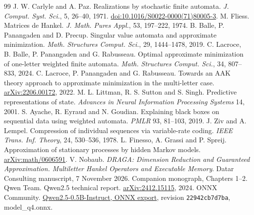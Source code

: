 \begin{thebibliography}{99}
 J. W. Carlyle and A. Paz. Realizations by stochastic finite automata. \emph{J. Comput. Syst. Sci.}, 5, 26--40, 1971. \href{https://doi.org/10.1016/S0022-0000(71)80005-3}{doi:10.1016/S0022-0000(71)80005-3}.
 M. Fliess. Matrices de Hankel. \emph{J. Math. Pures Appl.}, 53, 197--222, 1974.
 B. Balle, P. Panangaden and D. Precup. Singular value automata and approximate minimization. \emph{Math. Structures Comput. Sci.}, 29, 1444--1478, 2019.
 C. Lacroce, B. Balle, P. Panangaden and G. Rabusseau. Optimal approximate minimization of one-letter weighted finite automata. \emph{Math. Structures Comput. Sci.}, 34, 807--833, 2024.
 C. Lacroce, P. Panangaden and G. Rabusseau. Towards an AAK theory approach to approximate minimization in the multi-letter case. \href{https://arxiv.org/abs/2206.00172}{arXiv:2206.00172}, 2022.
 M. L. Littman, R. S. Sutton and S. Singh. Predictive representations of state. \emph{Advances in Neural Information Processing Systems} 14, 2001.
 S. Ayache, R. Eyraud and N. Goudian. Explaining black boxes on sequential data using weighted automata. \emph{PMLR} 93, 81--103, 2019.
 J. Ziv and A. Lempel. Compression of individual sequences via variable-rate coding. \emph{IEEE Trans. Inf. Theory}, 24, 530--536, 1978.
 L. Finesso, A. Grassi and P. Spreij. Approximation of stationary processes by hidden Markov models. \href{https://arxiv.org/abs/math/0606591}{arXiv:math/0606591}.
 V. Nobaub. \emph{DRAGA: Dimension Reduction and Guaranteed Approximation. Multiletter Hankel Operators and Executable Memory}. Datar Consulting manuscript, 7 November 2026. Companion monograph, Chapters 1--2.
 Qwen Team. Qwen2.5 technical report. \href{https://arxiv.org/abs/2412.15115}{arXiv:2412.15115}, 2024.
 ONNX Community. \href{https://huggingface.co/onnx-community/Qwen2.5-0.5B-Instruct/tree/22942cb7d7ba4cc81bb4673549ca4d4614469b5e}{Qwen2.5-0.5B-Instruct, ONNX export}, revision \texttt{22942cb7d7ba}, model\_q4.onnx.
\end{thebibliography}
